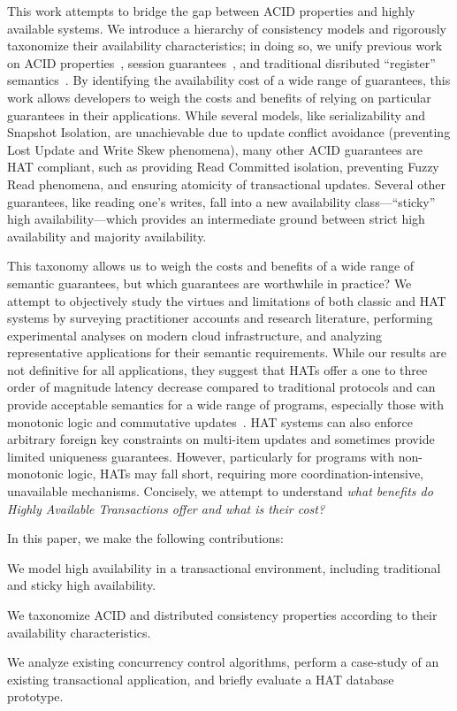 This work attempts to bridge the gap between ACID properties and
highly available systems. We introduce a hierarchy of consistency
models and rigorously taxonomize their availability characteristics;
in doing so, we unify previous work on ACID properties~\cite{adya},
session guarantees~\cite{sessionguarantees}, and traditional
disributed ``register'' semantics~\cite{herlihy-art}. By identifying
the availability cost of a wide range of guarantees, this work allows
developers to weigh the costs and benefits of relying on particular
guarantees in their applications. While several models, like
serializability and Snapshot Isolation, are unachievable due to update
conflict avoidance (preventing Lost Update and Write Skew phenomena),
many other ACID guarantees are HAT compliant, such as providing Read
Committed isolation, preventing Fuzzy Read phenomena, and ensuring
atomicity of transactional updates. Several other guarantees, like
reading one's writes, fall into a new availability class---``sticky''
high availability---which provides an intermediate ground between
strict high availability and majority availability.

This taxonomy allows us to weigh the costs and benefits of a wide
range of semantic guarantees, but which guarantees are worthwhile in
practice? We attempt to objectively study the virtues and limitations
of both classic and HAT systems by surveying practitioner accounts and
research literature, performing experimental analyses on modern cloud
infrastructure, and analyzing representative applications for their
semantic requirements. While our results are not definitive for all
applications, they suggest that HATs offer a one to three order of
magnitude latency decrease compared to traditional protocols and can
provide acceptable semantics for a wide range of programs, especially
those with monotonic logic and commutative updates~\cite{calm, blooml,
  crdt}. HAT systems can also enforce arbitrary foreign key
constraints on multi-item updates and sometimes provide limited
uniqueness guarantees. However, particularly for programs with
non-monotonic logic, HATs may fall short, requiring more
coordination-intensive, unavailable mechanisms. Concisely, we attempt
to understand \textit{what benefits do Highly Available Transactions
  offer and what is their cost?}

In this paper, we make the following contributions:
\begin{myitemize}
\item We model high availability in a transactional environment,
  including traditional and sticky high availability.

\item We taxonomize ACID and distributed consistency properties
  according to their availability characteristics.

\item We analyze existing concurrency control algorithms, perform a
  case-study of an existing transactional application, and
  briefly evaluate a HAT database prototype.
\end{myitemize}

